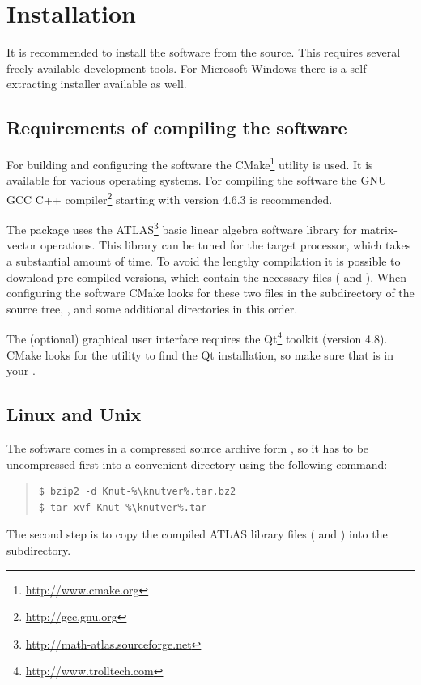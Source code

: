 \documentclass[10pt,a4paper]{ddedoc}
\begin{document}
\section{Installation}

It is recommended to install the software from the source. This requires several freely
available development tools. For Microsoft Windows there is a self-extracting installer
available as well.

\subsection{Requirements of compiling the software}

For building and configuring the software the CMake\footnote{\url{http://www.cmake.org}}
utility is used. It is available for various operating systems. For compiling 
the software the GNU GCC C++ compiler\footnote{\url{http://gcc.gnu.org}} starting with 
version 4.6.3 is recommended.

The package uses the ATLAS\footnote{\url{http://math-atlas.sourceforge.net}}
basic linear algebra software library for matrix-vector operations. This library can be
tuned for the target processor, which takes a substantial amount of time.
To avoid the lengthy compilation it is possible to download
pre-compiled versions, which contain the necessary files ( and
). When configuring the software CMake looks for these two files
in the  subdirectory of the source tree, ,  
and some additional directories in this order.

The (optional) graphical user interface requires the Qt\footnote{\url{http://www.trolltech.com}} 
toolkit (version 4.8). CMake looks for the  utility to find the Qt
installation, so make sure that  is in your .

\subsection{Linux and Unix}

The software comes in a compressed source archive form
, so it has to be uncompressed first into a
convenient directory using the following command:
{ \small \begin{quote} \begin{lstlisting}[basicstyle=\ttfamily,frame=single]
$ bzip2 -d Knut-%\knutver%.tar.bz2
$ tar xvf Knut-%\knutver%.tar
\end{lstlisting} \end{quote} } \noindent
The second step is to copy the compiled ATLAS library files (
and ) into the
 subdirectory.
\end{document}
